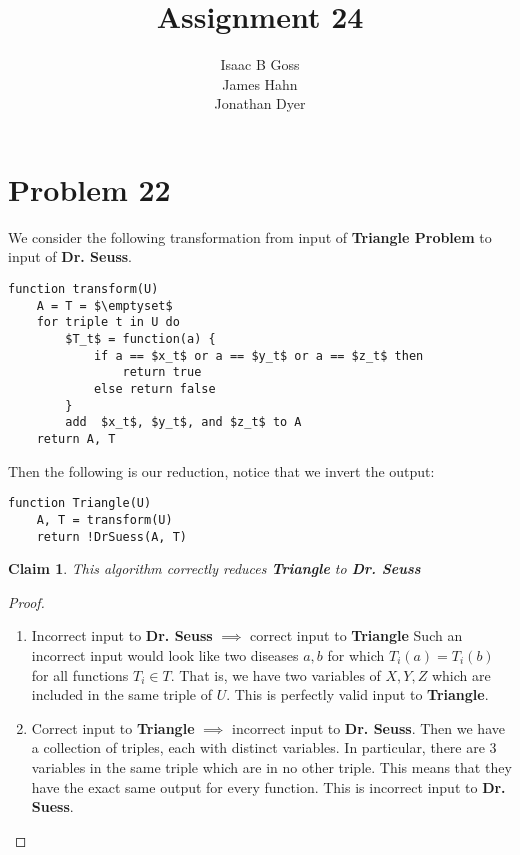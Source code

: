 \documentclass{article}
\author{Isaac B Goss\\ James Hahn\\ Jonathan Dyer}
\title{Assignment 24}
\newtheorem{thm}{Claim}
\providecommand{\prob}[1]{\section*{Problem #1}}
\begin{document}
\maketitle

    \prob{22}
    We consider the following transformation from input of \textbf{Triangle Problem} to input of \textbf{Dr. Seuss}.
    \begin{lstlisting}
function transform(U)
    A = T = $\emptyset$
    for triple t in U do
        $T_t$ = function(a) {
            if a == $x_t$ or a == $y_t$ or a == $z_t$ then
                return true
            else return false
        }
        add  $x_t$, $y_t$, and $z_t$ to A
    return A, T
    \end{lstlisting}

Then the following is our reduction, notice that we invert the output:
\begin{lstlisting}
function Triangle(U)
    A, T = transform(U)
    return !DrSuess(A, T)
\end{lstlisting}

\begin{thm}
    This algorithm correctly reduces \textbf{Triangle} to \textbf{Dr. Seuss}
\end{thm}
\begin{proof}
    
    \begin{enumerate}
        \item Incorrect input to \textbf{Dr. Seuss} $\implies$ correct input to \textbf{Triangle}
        Such an incorrect input would look like two diseases $a, b$ for which $T_i(a) = T_i(b)$ for all functions $T_i \in T$.
        That is, we have two variables of $X,Y,Z$ which are included in the same triple of $U$.
        This is perfectly valid input to \textbf{Triangle}.

        \item Correct input to \textbf{Triangle} $\implies$ incorrect input to \textbf{Dr. Seuss}.
        Then we have a collection of triples, each with distinct variables.
        In particular, there are 3 variables in the same triple which are in no other triple.
        This means that they have the exact same output for every function.
        This is incorrect input to \textbf{Dr. Suess}.
    \end{enumerate}
\end{proof}
\end{document}
